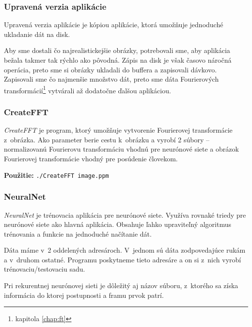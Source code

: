 \subsubsection{Upravená verzia aplikácie}
\label{chap:saveimageapp}
Upravená verzia aplikácie je kópiou aplikácie, ktorá umožňuje jednoduché ukladanie dát na disk.

Aby sme dostali čo najrealistickejšie obrázky, potrebovali sme, aby aplikácia bežala takmer tak rýchlo ako pôvodná. Zápis na disk je však časovo náročná operácia, preto sme si obrázky ukladali do buffera a zapisovali dávkovo. Zapisovali sme čo najmenšie množstvo dát, preto sme dáta Fourierových transformácií\footnote{kapitola \ref{chap:ft} } vytvárali až dodatočne ďalšou aplikáciou.

\subsubsection{CreateFFT}

\textit{CreateFFT} je program, ktorý umožňuje vytvorenie Fourierovej transformácie z~obrázka. Ako parameter berie cestu k~obrázku a vyrobí 2 súbory -- normalizovanú Fourierovu transformáciu vhodnú pre neurónové siete a obrázok Fourierovej transformácie vhodný pre posúdenie človekom.

\textbf{Použitie:} {\tt ./CreateFFT image.ppm}

\subsubsection{NeuralNet}
\textit{NeuralNet} je trénovacia aplikácia pre neurónové siete. Využíva rovnaké triedy pre neurónové siete ako hlavná aplikácia. Obsahuje ľahko upraviteľný algoritmus trénovania a funkcie na jednoduché načítanie dát. 

Dáta máme v~2 oddelených adresároch. V~jednom sú dáta zodpovedajúce rukám a v~druhom ostatné. Programu poskytneme tieto adresáre a on si z~nich vyrobí trénovaciu/testovaciu sadu.

Pri rekurentnej neurónovej sieti je dôležitý aj názov súboru, z~ktorého sa získa informácia do ktorej postupnosti a framu prvok patrí.

